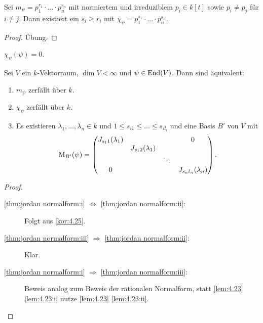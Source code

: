 \documentclass[12pt,a4paper]{scrartcl}
\theoremstyle{cplain}
\theoremstyle{cdef}
\begin{document}
\begin{kor} \label{kor:4.25}
	Sei $m_{\psi} = p_1^{r_1}\cdot\ldots\cdot p_n^{r_n}$ mit normiertem und irreduziblem $p_i\in k[t]$ sowie $p_i\neq p_j$ für $i\neq j$. Dann existiert ein $s_i\ge r_i$ mit $\chi_{\psi} = p_1^{s_1}\cdot\ldots\cdot p_n^{s_n}$.
\end{kor}
\begin{proof}
	Übung.
\end{proof}

\begin{kor}
	$\chi_{\psi}(\psi) = 0$.
\end{kor}

\begin{satz}
	Sei $V$ ein $k$-Vektorraum, $\dim V<\infty$ und $\psi\in\operatorname{End}(V)$. Dann sind äquivalent:
	\begin{enumerate}
		\item $m_{\psi}$ zerfällt über $k$. \label{thm:jordan normalform:i}
		\item $\chi_{\psi}$ zerfällt über $k$. \label{thm:jordan normalform:ii}
		\item Es existieren $\lambda_1,\dots, \lambda_n\in k$ und $1\le s_{i1}\le\dots\le s_{il_i}$ und eine Basis $B'$ von $V$ mit
		\[\operatorname{M}_{B'}(\psi) = \begin{pmatrix}
		J_{s_11}(\lambda_1) &  &  & 0 \\ 
		& J_{s_12}(\lambda_1) &  &  \\ 
		&  & \ddots &  \\ 
		0 &  &  & J_{s_{n}l_n}(\lambda_n)
		\end{pmatrix}.\] \label{thm:jordan normalform:iii}
	\end{enumerate}
\end{satz}
\begin{proof}
	\leavevmode
	\begin{description}
		\item[\ref{thm:jordan normalform:i} $\Leftrightarrow$ \ref{thm:jordan normalform:ii}:] Folgt aus \cref{kor:4.25}.
		\item[\ref{thm:jordan normalform:iii} $\Rightarrow$ \ref{thm:jordan normalform:ii}:] Klar.
		\item[\ref{thm:jordan normalform:i} $\Rightarrow$ \ref{thm:jordan normalform:iii}:] Beweis analog zum Beweis der rationalen Normalform, statt \cref{lem:4.23} \ref{lem:4.23:i} nutze \cref{lem:4.23} \ref{lem:4.23:ii}.
		\qedhere
	\end{description}
\end{proof}
\end{document}
